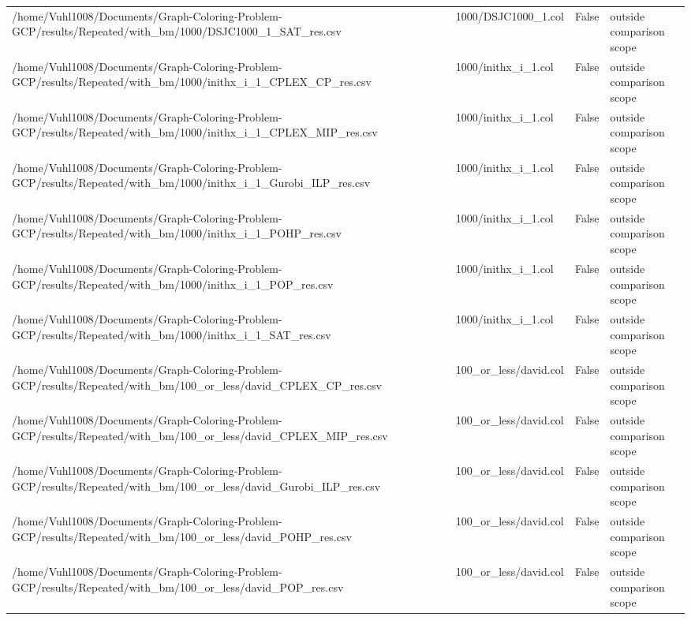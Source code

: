 \begin{table}[htbp]
\begin{tabular}{llll}
/home/Vuhl1008/Documents/Graph-Coloring-Problem-GCP/results/Repeated/with\_bm/1000/DSJC1000\_1\_SAT\_res.csv & 1000/DSJC1000\_1.col & False & outside comparison scope \\
/home/Vuhl1008/Documents/Graph-Coloring-Problem-GCP/results/Repeated/with\_bm/1000/inithx\_i\_1\_CPLEX\_CP\_res.csv & 1000/inithx\_i\_1.col & False & outside comparison scope \\
/home/Vuhl1008/Documents/Graph-Coloring-Problem-GCP/results/Repeated/with\_bm/1000/inithx\_i\_1\_CPLEX\_MIP\_res.csv & 1000/inithx\_i\_1.col & False & outside comparison scope \\
/home/Vuhl1008/Documents/Graph-Coloring-Problem-GCP/results/Repeated/with\_bm/1000/inithx\_i\_1\_Gurobi\_ILP\_res.csv & 1000/inithx\_i\_1.col & False & outside comparison scope \\
/home/Vuhl1008/Documents/Graph-Coloring-Problem-GCP/results/Repeated/with\_bm/1000/inithx\_i\_1\_POHP\_res.csv & 1000/inithx\_i\_1.col & False & outside comparison scope \\
/home/Vuhl1008/Documents/Graph-Coloring-Problem-GCP/results/Repeated/with\_bm/1000/inithx\_i\_1\_POP\_res.csv & 1000/inithx\_i\_1.col & False & outside comparison scope \\
/home/Vuhl1008/Documents/Graph-Coloring-Problem-GCP/results/Repeated/with\_bm/1000/inithx\_i\_1\_SAT\_res.csv & 1000/inithx\_i\_1.col & False & outside comparison scope \\
/home/Vuhl1008/Documents/Graph-Coloring-Problem-GCP/results/Repeated/with\_bm/100\_or\_less/david\_CPLEX\_CP\_res.csv & 100\_or\_less/david.col & False & outside comparison scope \\
/home/Vuhl1008/Documents/Graph-Coloring-Problem-GCP/results/Repeated/with\_bm/100\_or\_less/david\_CPLEX\_MIP\_res.csv & 100\_or\_less/david.col & False & outside comparison scope \\
/home/Vuhl1008/Documents/Graph-Coloring-Problem-GCP/results/Repeated/with\_bm/100\_or\_less/david\_Gurobi\_ILP\_res.csv & 100\_or\_less/david.col & False & outside comparison scope \\
/home/Vuhl1008/Documents/Graph-Coloring-Problem-GCP/results/Repeated/with\_bm/100\_or\_less/david\_POHP\_res.csv & 100\_or\_less/david.col & False & outside comparison scope \\
/home/Vuhl1008/Documents/Graph-Coloring-Problem-GCP/results/Repeated/with\_bm/100\_or\_less/david\_POP\_res.csv & 100\_or\_less/david.col & False & outside comparison scope \\

\end{tabular}
\end{table}
